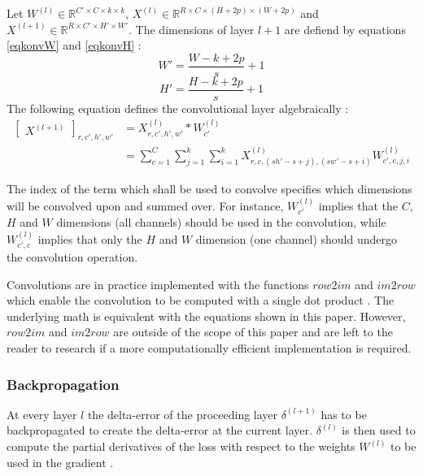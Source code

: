 \documentclass[a4paper, twoside]{article}
\begin{document}
Let $W^{(l)} \in \mathbb{R}^{C' \times C  \times k \times k}$, $X^{(l)} \in \mathbb{R}^{R \times C  \times (H+2p) \times (W+2p)}$ and $X^{(l+1)} \in \mathbb{R}^{R \times C'  \times H' \times W'}$. The dimensions of layer $l+1$ are defiend by equations \eqref{eqkonvW} and \eqref{eqkonvH} \cite{cs231n} \cite{convmath} \cite{convarithmetic}: 
\begin{equation}\label{eqkonvW}
W' = \frac{W-k+2p}{s} +1
\end{equation}
\begin{equation}\label{eqkonvH}
H' = \frac{H-k+2p}{s} +1
\end{equation}
The following equation defines the convolutional layer algebraically \cite{cs231n} \cite{convmath}:
\begin{equation}\label{konvolution}
\begin{split}
	\begin{bmatrix} X^{(l+1)} \end{bmatrix}_{r, c', h', w'}	
		& = X^{(l)}_{r, c', h', w'} *W^{(l)}_{c'} \\
		& = \sum^{C }_{c=1} \sum^{k }_{j=1} \sum^{k }_{i=1} X^{(l)}_{r, c, (sh'-s+j), (sw'-s+i)}W^{(l)}_{c', c, j, i}
\end{split}
\end{equation}

The index of the term which shall be used to convolve specifies which dimensions will be convolved upon and summed over. For instance, $W^{(l)}_{c'}$ implies that the $C$, $H$ and $W$ dimensions (all channels) should be used in the convolution, while $W^{(l)}_{c', c}$ implies that only the $H$ and $W$ dimension (one channel) should undergo the convolution operation.

Convolutions are in practice implemented with the functions $row2im$ and $im2row$ which enable the convolution to be computed with a single dot product \cite{cs231n} \cite{convmath} \cite{convarithmetic}. The underlying math is equivalent with the equations shown in this paper. However, $row2im$ and $im2row$ are outside of the scope of this paper and are left to the reader to research if a more computationally efficient implementation is required. 

\subsubsection{Backpropagation}
At every layer $l$ the delta-error of the proceeding layer $\delta^{(l+1)}$ has to be backpropagated to create the delta-error at the current layer. $\delta^{(l)}$ is then used to compute the partial derivatives of the loss with respect to the weights $W^{(l)}$ to be used in the gradient \cite{cs231n} \cite{convmath}. 
 
\end{document}

